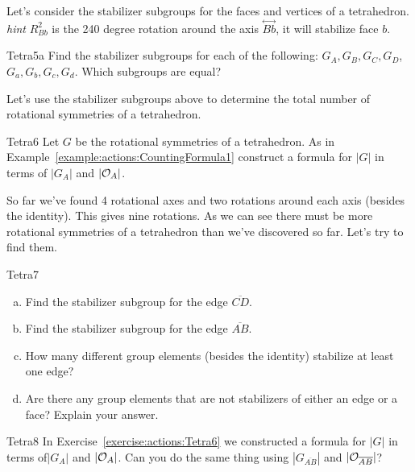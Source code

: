 Let's consider the stabilizer subgroups for the faces and vertices of a tetrahedron. \emph {hint} $R_{Bb}^2$ is the 240 degree rotation around the axis $\overset{\leftrightarrow}{Bb}$, it will stabilize face $b$.  

\begin{exercise}{Tetra5a}
Find the stabilizer subgroups for each of the following:
$G_{A}, G_{B}, G_{C}, G_{D}$, $G_{a}, G_{b}, G_{c}, G_{d}$. Which subgroups are equal?
\end{exercise}

Let's use the stabilizer subgroups above to determine the total number of rotational symmetries of a tetrahedron.  

\begin{exercise}{Tetra6} 
Let $G$ be the rotational symmetries of a tetrahedron.  As in Example~\ref{example:actions:CountingFormula1} construct a formula for $|G|$ in terms of $| G_{A}|$ and $|{\cal O}_{A}|$.  \end {exercise}
So far we've found 4 rotational axes and two rotations around each axis (besides the identity). This gives nine rotations.  As we can see there must be more rotational symmetries of a tetrahedron than we've discovered so far.  Let's try to find them. 

\begin {exercise}{Tetra7}
\begin {enumerate}[(a)]
\item Find the stabilizer subgroup for the edge $\overline{CD}$. 
\item Find the stabilizer subgroup for the edge $\overline{AB}$.
\item How many different group elements (besides the identity) stabilize at least one edge?
\item Are there any group elements that are not stabilizers of either an edge or a face?  Explain your answer.
\end{enumerate}
\end{exercise}	

\begin {exercise}{Tetra8}
In Exercise~\ref{exercise:actions:Tetra6} we constructed a formula for $|G|$ in terms of$| G_{A}|$ and $|{\cal O}_{A}|$.  Can you do the same thing using $| G_{\overline{AB}}|$ and $|{\cal O}_{\overline{AB}}|$?
\end{exercise}

